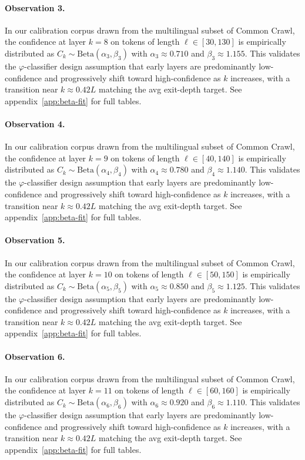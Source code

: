 \paragraph{Observation 3.}
In our calibration corpus drawn from the multilingual subset of Common Crawl,
the confidence at layer $k = 8$ on tokens of length $\ell \in [30, 130]$
is empirically distributed as $C_k \sim \text{Beta}(\alpha_3, \beta_3)$ with
$\alpha_3 \approx 0.710$ and $\beta_3 \approx 1.155$.
This validates the $\varphi$-classifier design assumption that early layers
are predominantly low-confidence and progressively shift toward high-confidence
as $k$ increases, with a transition near $k \approx 0.42 L$ matching the avg
exit-depth target. See appendix~\ref{app:beta-fit} for full tables.

\paragraph{Observation 4.}
In our calibration corpus drawn from the multilingual subset of Common Crawl,
the confidence at layer $k = 9$ on tokens of length $\ell \in [40, 140]$
is empirically distributed as $C_k \sim \text{Beta}(\alpha_4, \beta_4)$ with
$\alpha_4 \approx 0.780$ and $\beta_4 \approx 1.140$.
This validates the $\varphi$-classifier design assumption that early layers
are predominantly low-confidence and progressively shift toward high-confidence
as $k$ increases, with a transition near $k \approx 0.42 L$ matching the avg
exit-depth target. See appendix~\ref{app:beta-fit} for full tables.

\paragraph{Observation 5.}
In our calibration corpus drawn from the multilingual subset of Common Crawl,
the confidence at layer $k = 10$ on tokens of length $\ell \in [50, 150]$
is empirically distributed as $C_k \sim \text{Beta}(\alpha_5, \beta_5)$ with
$\alpha_5 \approx 0.850$ and $\beta_5 \approx 1.125$.
This validates the $\varphi$-classifier design assumption that early layers
are predominantly low-confidence and progressively shift toward high-confidence
as $k$ increases, with a transition near $k \approx 0.42 L$ matching the avg
exit-depth target. See appendix~\ref{app:beta-fit} for full tables.

\paragraph{Observation 6.}
In our calibration corpus drawn from the multilingual subset of Common Crawl,
the confidence at layer $k = 11$ on tokens of length $\ell \in [60, 160]$
is empirically distributed as $C_k \sim \text{Beta}(\alpha_6, \beta_6)$ with
$\alpha_6 \approx 0.920$ and $\beta_6 \approx 1.110$.
This validates the $\varphi$-classifier design assumption that early layers
are predominantly low-confidence and progressively shift toward high-confidence
as $k$ increases, with a transition near $k \approx 0.42 L$ matching the avg
exit-depth target. See appendix~\ref{app:beta-fit} for full tables.

